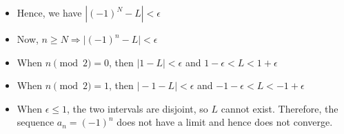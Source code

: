 \documentclass{article}
\begin{document}
\begin{itemize}
\begin{itemize}
        \[ (\forall \epsilon > 0)(\exists N \in \mathbb{N})(\forall n \ge N) \vert (-1)^n - L \vert < \epsilon \]
        \item Hence, we have $\left\vert (-1)^N - L \right\vert < \epsilon$
        \item Now, $n \ge N \Rightarrow \vert (-1)^n - L \vert < \epsilon$
        \item When $n \pmod 2 = 0$, then $\vert 1 - L \vert < \epsilon$ and $1 - \epsilon < L < 1 + \epsilon$
        \item When $n \pmod 2 = 1$, then $\vert -1 - L \vert < \epsilon$ and $-1 - \epsilon < L < -1 + \epsilon$
        \item When $\epsilon \le 1$, the two intervals are disjoint, so $L$ cannot exist. Therefore, the sequence $a_n = (-1)^n$ does not have a limit and hence does not converge.
    \end{itemize}
\end{itemize}
\end{document}
